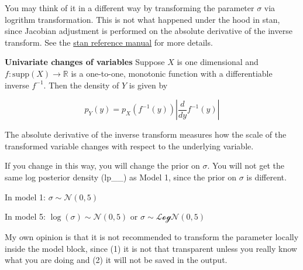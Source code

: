 \documentclass[
  letterpaper,
  DIV=11,
  numbers=noendperiod]{scrartcl}
\begin{document}
You may think of it in a different way by transforming the parameter
\(\sigma\) via logrithm transformation. This is not what happened under
the hood in stan, since Jacobian adjustment is performed on the absolute
derivative of the inverse transform. See the
\href{https://mc-stan.org/docs/reference-manual/transforms.html}{stan
reference manual} for more details.

\begin{note}
\textbf{Univariate changes of variables}
Suppose $X$ is one dimensional and $f : \mathrm{supp}(X) \to \mathbb{R}$ is a one-to-one, monotonic function with a differentiable inverse $f^{-1}$. Then the density of $Y$ is given by

$$
p_Y(y) = p_X(f^{-1}(y)) \left| \frac{d}{dy} f^{-1}(y) \right|
$$

The absolute derivative of the inverse transform measures how the scale of the transformed variable changes with respect to the underlying variable.
\end{note}

If you change in this way, you will change the prior on \(\sigma\). You
will not get the same log posterior density (lp\_\_) as Model 1, since
the prior on \(\sigma\) is different.

In model 1: \(\sigma \sim \mathcal{N}(0, 5)\)

In model 5: \(\log(\sigma) \sim \mathcal{N}(0, 5)\) or
\(\sigma \sim \mathcal{LogN}(0, 5)\)

My own opinion is that it is not recommended to transform the parameter
locally inside the model block, since (1) it is not that transparent
unless you really know what you are doing and (2) it will not be saved
in the output.
\end{document}
